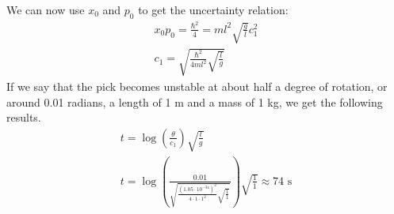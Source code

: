 \documentclass[12pt]{article}
\begin{document}
\begin{enumerate}
    We can now use $x_0$ and $p_0$ to get the uncertainty relation:
    \begin{gather*}
      x_0 p_0=\frac{\hbar^2}{4}=ml^2\sqrt{\frac{g}{l}}c_1^2\\
      c_1=\sqrt{\frac{\hbar^2}{4ml^2}\sqrt{\frac{l}{g}}}
    \end{gather*}
    If we say that the pick becomes unstable at about half a degree of rotation, or around 0.01 radians, a length of 1 m and a mass of 1 kg, we get the following results.
    \begin{gather*}
      t=\log\left(\frac{\theta}{c_1}\right)\sqrt{\frac{l}{g}}\\
      t=\log\left(\frac{0.01}{\sqrt{\frac{(1.05\cdot10^{-34})^2}{4\cdot 1\cdot 1^2}\sqrt{\frac{1}{1}}}}\right)\sqrt{\frac{1}{1}}\approx74\text{ s}
    \end{gather*}
  \end{enumerate}
\end{document}
